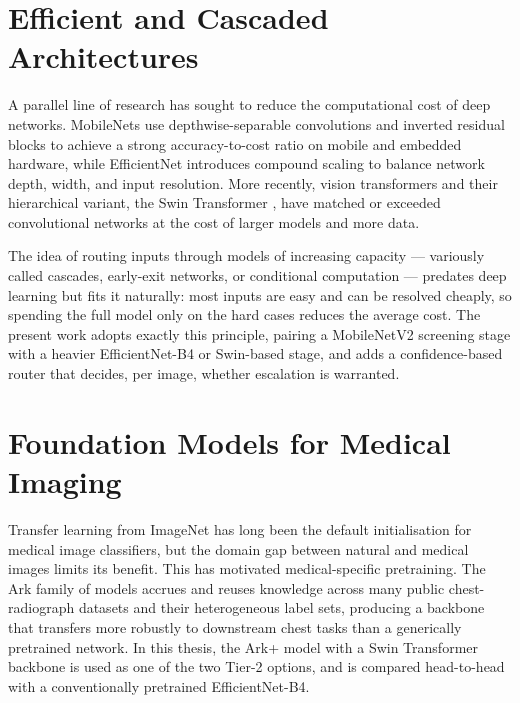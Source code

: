 \section{Efficient and Cascaded Architectures}
A parallel line of research has sought to reduce the computational cost of deep networks. MobileNets \cite{howard2017mobilenets, sandler2018mobilenetv2} use depthwise-separable convolutions and inverted residual blocks to achieve a strong accuracy-to-cost ratio on mobile and embedded hardware, while EfficientNet \cite{tan2019efficientnet} introduces compound scaling to balance network depth, width, and input resolution. More recently, vision transformers \cite{dosovitskiy2021image} and their hierarchical variant, the Swin Transformer \cite{liu2021swin}, have matched or exceeded convolutional networks at the cost of larger models and more data.

The idea of routing inputs through models of increasing capacity --- variously called cascades, early-exit networks, or conditional computation --- predates deep learning but fits it naturally: most inputs are easy and can be resolved cheaply, so spending the full model only on the hard cases reduces the average cost. The present work adopts exactly this principle, pairing a MobileNetV2 screening stage with a heavier EfficientNet-B4 or Swin-based stage, and adds a confidence-based router that decides, per image, whether escalation is warranted.

\section{Foundation Models for Medical Imaging}
Transfer learning from ImageNet \cite{deng2009imagenet, russakovsky2015imagenet} has long been the default initialisation for medical image classifiers, but the domain gap between natural and medical images limits its benefit. This has motivated medical-specific pretraining. The Ark family of models \cite{ma2023foundation} accrues and reuses knowledge across many public chest-radiograph datasets and their heterogeneous label sets, producing a backbone that transfers more robustly to downstream chest tasks than a generically pretrained network. In this thesis, the Ark+ model with a Swin Transformer backbone is used as one of the two Tier-2 options, and is compared head-to-head with a conventionally pretrained EfficientNet-B4.

